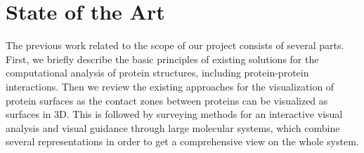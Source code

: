 \documentclass[11pt,a4paper,titlepage,oneside,onecolumn]{article}
\begin{document}





\section{State of the Art}
\label{sec:StateOfTheArt}
The previous work related to the scope of our project consists of several parts. 
First, we briefly describe the basic principles of existing solutions for the computational analysis of protein structures, including protein-protein interactions. 
Then we review the existing approaches for the visualization of protein surfaces as the contact zones between proteins can be visualized as surfaces in 3D.
This is followed by surveying methods for an interactive visual analysis and visual guidance through large molecular systems, which combine several representations in order to get a comprehensive view on the whole system. 
\end{document}
